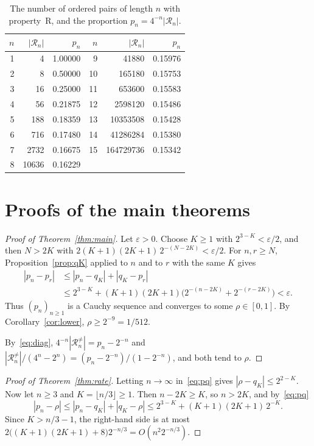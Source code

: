 \documentclass[11pt]{amsart}
\theoremstyle{remark}
\numberwithin{equation}{section}
\newcommand{\R}{\mathcal{R}}
\begin{document}
\begin{table}[ht]
\caption{The number of ordered pairs of length $n$ with property~R, and the proportion $p_n=4^{-n}|\R_n|$.}\label{tab:counts}
\centering
\begin{tabular}{rrr@{\qquad}rrr}
\toprule
$n$ & $|\R_n|$ & $p_n$ & $n$ & $|\R_n|$ & $p_n$\\
\midrule
1 & 4 & 1.00000 & 9 & 41880 & 0.15976\\
2 & 8 & 0.50000 & 10 & 165180 & 0.15753\\
3 & 16 & 0.25000 & 11 & 653600 & 0.15583\\
4 & 56 & 0.21875 & 12 & 2598120 & 0.15486\\
5 & 188 & 0.18359 & 13 & 10353508 & 0.15428\\
6 & 716 & 0.17480 & 14 & 41286284 & 0.15380\\
7 & 2732 & 0.16675 & 15 & 164729736 & 0.15342\\
8 & 10636 & 0.16229 & & &\\
\bottomrule
\end{tabular}
\end{table}

\section{Proofs of the main theorems}\label{sec:proofs}

\begin{proof}[Proof of Theorem~\ref{thm:main}]
Let $\varepsilon>0$. Choose $K\ge1$ with $2^{3-K}<\varepsilon/2$, and then $N>2K$ with $2(K+1)(2K+1)\,2^{-(N-2K)}<\varepsilon/2$. For $n,r\ge N$, Proposition~\ref{prop:qK} applied to $n$ and to $r$ with the same $K$ gives
\[
  \begin{aligned}
  |p_n-p_r|&\le |p_n-q_K|+|q_K-p_r|\\
  &\le 2^{3-K}+(K+1)(2K+1)\bigl(2^{-(n-2K)}+2^{-(r-2K)}\bigr)<\varepsilon .
  \end{aligned}
\]
Thus $(p_n)_{n\ge1}$ is a Cauchy sequence and converges to some $\rho\in[0,1]$. By Corollary~\ref{cor:lower}, $\rho\ge2^{-9}=1/512$.

By~\eqref{eq:diag}, $4^{-n}|\R_n^{\neq}|=p_n-2^{-n}$ and $|\R_n^{\neq}|/(4^n-2^n)=(p_n-2^{-n})/(1-2^{-n})$, and both tend to $\rho$.
\end{proof}

\begin{proof}[Proof of Theorem~\ref{thm:rate}]
Letting $n\to\infty$ in~\eqref{eq:pq} gives $|\rho-q_K|\le2^{2-K}$. Now let $n\ge3$ and $K=\lfloor n/3\rfloor\ge1$. Then $n-2K\ge K$, so $n>2K$, and by~\eqref{eq:pq}
\[
  |p_n-\rho|\le|p_n-q_K|+|q_K-\rho|\le 2^{3-K}+(K+1)(2K+1)\,2^{-K}.
\]
Since $K>n/3-1$, the right-hand side is at most $2\bigl((K+1)(2K+1)+8\bigr)2^{-n/3}=O(n^{2}2^{-n/3})$.
\end{proof}
\end{document}

